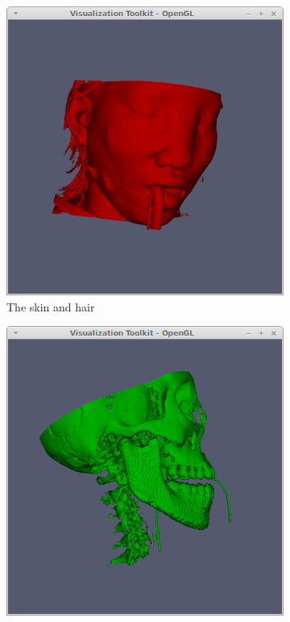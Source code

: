 \documentclass{article}[10pt]
\begin{document}
\begin{figure}[h]
        \centering
        \begin{subfigure}[b]{0.3\textwidth}
                \includegraphics[width=\textwidth]{red}
                \caption{The skin and hair}
                \label{fig:red}
        \end{subfigure}%
        \begin{subfigure}[b]{0.3\textwidth}
                \includegraphics[width=\textwidth]{green}

\end{subfigure}
\end{figure}
\end{document}
